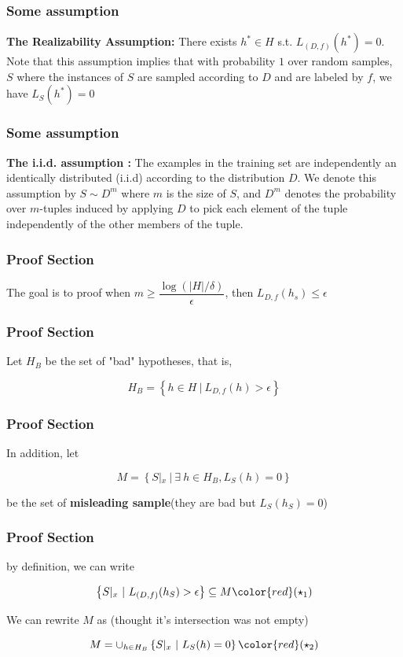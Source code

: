 \documentclass[xcolor=dvipsnames]{beamer}
\theoremstyle{plain}
\newcommand{\sett}[1]{\left\{#1 \right\}}
\begin{document}
\begin{frame}
	\frametitle{Some assumption}
	\textbf{The Realizability Assumption:} There exists $h^* \in H$ s.t. $L_{(D,f)}(h^*) = 0$. Note that this assumption implies that with probability $1$ over random samples, $S$ where the instances of $S$ are sampled according to $D$ and are labeled by $f$, we have $L_S(h^*) = 0$

	
\end{frame}


\begin{frame}
	\frametitle{Some assumption}
	\textbf{The i.i.d. assumption :} The examples in the training set are independently an identically distributed (i.i.d) according to the distribution $D$. We denote this assumption by $S \sim D^m$ where $m$ is the size of $S$, and $D^m$ denotes the probability over $m$-tuples induced by applying $D$ to pick each element of the tuple independently of the other members of the tuple.
	
\end{frame}


\begin{frame}
	\frametitle{Proof Section}
	The goal is to proof when $m \geq \dfrac{\log(|H|/\delta)}{\epsilon}$, then $L_{D,f}(h_s) \leq \epsilon$
	
\end{frame}

\begin{frame}
	\frametitle{Proof Section}
	Let $H_B$ be the set of "bad" hypotheses, that is,

$$H_B = \sett{h \in H~|~L_{D,f}(h)>\epsilon}$$
	
\end{frame}


\begin{frame}
	\frametitle{Proof Section}
	In addition, let

$$M = \sett{S|_x ~|~ \exists~h \in H_B,L_S(h) = 0}$$

be the set of \textbf{misleading sample}(they are bad but $L_S(h_S) = 0$)
	
\end{frame}


\begin{frame}
	\frametitle{Proof Section}
	by definition, we can write 

$$\sett{S|_x ~|~ L_{(D,f)}(h_S) > \epsilon} \subseteq M\color{red}(\star_1) $$


We can rewrite $M$ as (thought it's intersection was not empty)

$$M = \cup_{h \in H_B}\sett{S|_x ~|~ L_S(h) = 0}\color{red}(\star_2)$$
	
\end{frame}
\end{document}
